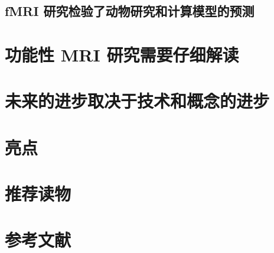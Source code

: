 \subsection{fMRI 研究检验了动物研究和计算模型的预测}

\section{功能性 MRI 研究需要仔细解读}

\section{未来的进步取决于技术和概念的进步}

\section{亮点}

\section{推荐读物}

\section{参考文献}

